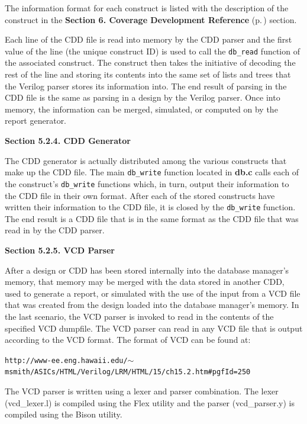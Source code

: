  The information format for each construct is listed with the description of the construct in the {\bf Section 6.  Coverage Development Reference} {\rm (p.\,\pageref{page_code_details})} section.

 Each line of the CDD file is read into memory by the CDD parser and the first value of the line (the unique construct ID) is used to call the {\tt db\_\-read} function of the associated construct. The construct then takes the initiative of decoding the rest of the line and storing its contents into the same set of lists and trees that the Verilog parser stores its information into. The end result of parsing in the CDD file is the same as parsing in a design by the Verilog parser. Once into memory, the information can be merged, simulated, or computed on by the report generator.



\begin{Desc}
\item[{\bf Section 5.2.4.  CDD Generator}]\par
 The CDD generator is actually distributed among the various constructs that make up the CDD file. The main {\tt db\_\-write} function located in {\bf db.c} calls each of the construct's {\tt db\_\-write} functions which, in turn, output their information to the CDD file in their own format. After each of the stored constructs have written their information to the CDD file, it is closed by the {\tt db\_\-write} function. The end result is a CDD file that is in the same format as the CDD file that was read in by the CDD parser.

\end{Desc}


\begin{Desc}
\item[{\bf Section 5.2.5.  VCD Parser}]\par
 After a design or CDD has been stored internally into the database manager's memory, that memory may be merged with the data stored in another CDD, used to generate a report, or simulated with the use of the input from a VCD file that was created from the design loaded into the database manager's memory. In the last scenario, the VCD parser is invoked to read in the contents of the specified VCD dumpfile. The VCD parser can read in any VCD file that is output according to the VCD format. The format of VCD can be found at:

 {\tt http://www-ee.eng.hawaii.edu/$\sim$msmith/ASICs/HTML/Verilog/LRM/HTML/15/ch15.2.htm\#pgf\-Id=250}

 The VCD parser is written using a lexer and parser combination. The lexer (vcd\_\-lexer.l) is compiled using the Flex utility and the parser (vcd\_\-parser.y) is compiled using the  Bison utility.

\end{Desc}



